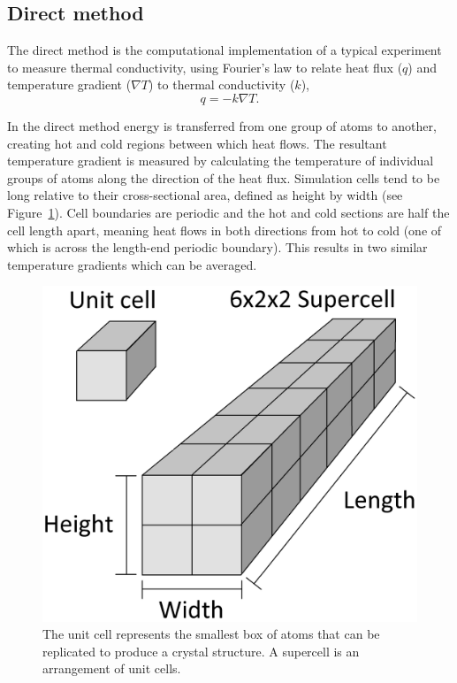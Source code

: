 \subsection{Direct method}
The direct method is the computational implementation of a typical experiment to measure thermal conductivity, using Fourier's law to relate heat flux ($q$) and temperature gradient ($\nabla{T}$) to thermal conductivity ($k$), 
\begin{equation}
q=-k \nabla{T} \label{fourier}.
\end{equation}

In the direct method energy is transferred from one group of atoms to another, creating hot and cold regions between which heat flows. The resultant temperature gradient is measured by calculating the temperature of individual groups of atoms along the direction of the heat flux. Simulation cells tend to be long relative to their cross-sectional area, defined as height by width (see Figure~\ref{fig:cell_dia}). Cell boundaries are periodic and the hot and cold sections are half the cell length apart, meaning heat flows in both directions from hot to cold (one of which is across the length-end periodic boundary). This results in two similar temperature gradients which can be averaged.

\begin{figure}[h]
  \includegraphics[width=\linewidth]{Figures/cell_diagram.png}
  \caption{The unit cell represents the smallest box of atoms that can be replicated to produce a crystal structure. A supercell is an arrangement of unit cells.}
  \label{fig:cell_dia}
\end{figure}

